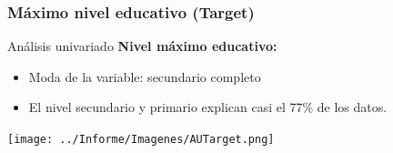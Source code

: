 \documentclass[pdf]{beamer}
\begin{document}
{%
           
           
 
           
           
           
           
    \subsubsection{Máximo nivel educativo (Target)}
    
\begin{frame}{Análisis univariado}
    \textbf{Nivel máximo educativo:}     
    \begin{itemize}
        \item Moda de la variable: secundario completo
        \item El nivel secundario y primario explican casi el 77\% de los datos.
    \end{itemize}    
    \begin{center}
        \texttt{[image: ../Informe/Imagenes/AUTarget.png]}    
    \end{center}
\end{frame}
    
}
\end{document}
